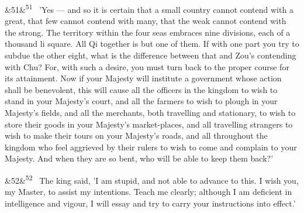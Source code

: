 \documentclass[12pt]{article}
\newcommand{\para}[1][]{\par\noindent\ifx&#1&\else\textsuperscript{\footnotesize #1}~\fi}
\begin{document}
\para[51] 'Yes --- and so it is certain that a small country cannot contend with a great, that few cannot contend with many, that the weak cannot contend with the strong. The territory within the four seas embraces nine divisions, each of a thousand li square. All Qi together is but one of them. If with one part you try to subdue the other eight, what is the difference between that and Zou's contending with Chu? For, with such a desire, you must turn back to the proper course for its attainment. Now if your Majesty will institute a government whose action shall be benevolent, this will cause all the officers in the kingdom to wish to stand in your Majesty's court, and all the farmers to wish to plough in your Majesty's fields, and all the merchants, both travelling and stationary, to wish to store their goods in your Majesty's market-places, and all travelling strangers to wish to make their tours on your Majesty's roads, and all throughout the kingdom who feel aggrieved by their rulers to wish to come and complain to your Majesty. And when they are so bent, who will be able to keep them back?'

\para[52] The king said, 'I am stupid, and not able to advance to this. I wish you, my Master, to assist my intentions. Teach me clearly; although I am deficient in intelligence and vigour, I will essay and try to carry your instructions into effect.'
\end{document}
